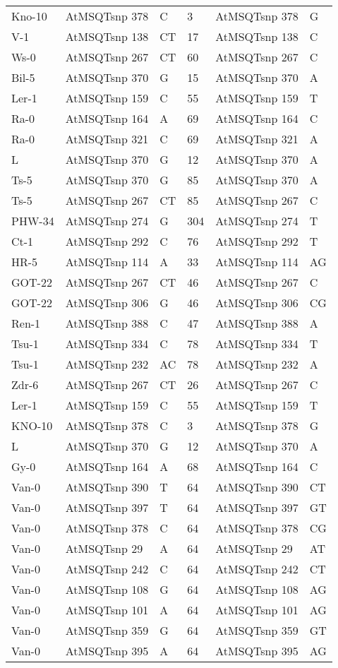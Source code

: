 \begin{center}
\begin{longtable}{|l|l|l|l|l|l|}
Kno-10&AtMSQTsnp 378&C&3&AtMSQTsnp 378&G\\
V-1&AtMSQTsnp 138&CT&17&AtMSQTsnp 138&C\\
Ws-0&AtMSQTsnp 267&CT&60&AtMSQTsnp 267&C\\
Bil-5&AtMSQTsnp 370&G&15&AtMSQTsnp 370&A\\
Ler-1&AtMSQTsnp 159&C&55&AtMSQTsnp 159&T\\
Ra-0&AtMSQTsnp 164&A&69&AtMSQTsnp 164&C\\
Ra-0&AtMSQTsnp 321&C&69&AtMSQTsnp 321&A\\
L&AtMSQTsnp 370&G&12&AtMSQTsnp 370&A\\
Ts-5&AtMSQTsnp 370&G&85&AtMSQTsnp 370&A\\
Ts-5&AtMSQTsnp 267&CT&85&AtMSQTsnp 267&C\\
PHW-34&AtMSQTsnp 274&G&304&AtMSQTsnp 274&T\\
Ct-1&AtMSQTsnp 292&C&76&AtMSQTsnp 292&T\\
HR-5&AtMSQTsnp 114&A&33&AtMSQTsnp 114&AG\\
GOT-22&AtMSQTsnp 267&CT&46&AtMSQTsnp 267&C\\
GOT-22&AtMSQTsnp 306&G&46&AtMSQTsnp 306&CG\\
Ren-1&AtMSQTsnp 388&C&47&AtMSQTsnp 388&A\\
Tsu-1&AtMSQTsnp 334&C&78&AtMSQTsnp 334&T\\
Tsu-1&AtMSQTsnp 232&AC&78&AtMSQTsnp 232&A\\
Zdr-6&AtMSQTsnp 267&CT&26&AtMSQTsnp 267&C\\
Ler-1&AtMSQTsnp 159&C&55&AtMSQTsnp 159&T\\
KNO-10&AtMSQTsnp 378&C&3&AtMSQTsnp 378&G\\
L&AtMSQTsnp 370&G&12&AtMSQTsnp 370&A\\
Gy-0&AtMSQTsnp 164&A&68&AtMSQTsnp 164&C\\
Van-0&AtMSQTsnp 390&T&64&AtMSQTsnp 390&CT\\
Van-0&AtMSQTsnp 397&T&64&AtMSQTsnp 397&GT\\
Van-0&AtMSQTsnp 378&C&64&AtMSQTsnp 378&CG\\
Van-0&AtMSQTsnp 29&A&64&AtMSQTsnp 29&AT\\
Van-0&AtMSQTsnp 242&C&64&AtMSQTsnp 242&CT\\
Van-0&AtMSQTsnp 108&G&64&AtMSQTsnp 108&AG\\
Van-0&AtMSQTsnp 101&A&64&AtMSQTsnp 101&AG\\
Van-0&AtMSQTsnp 359&G&64&AtMSQTsnp 359&GT\\
Van-0&AtMSQTsnp 395&A&64&AtMSQTsnp 395&AG\\

\end{longtable}
\end{center}
